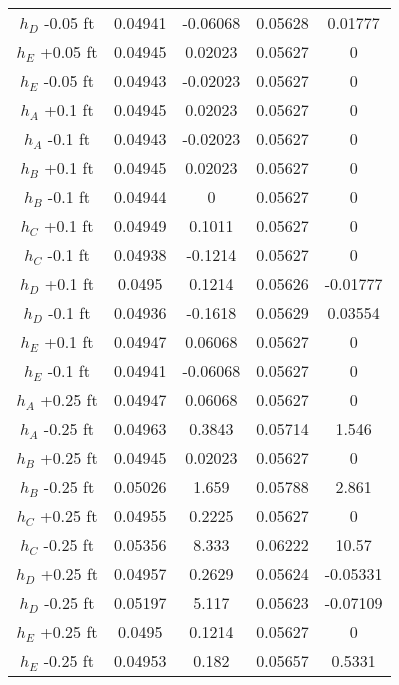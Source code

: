 \begin{linenumbers}
\begin{spacing}{1.0}
\begin{center}
\begin{longtable}{c|cc|cc}
	$h_{D}$ -0.05 ft&						0.04941&	-0.06068&	0.05628&	0.01777\\ 
	$h_{E}$ +0.05 ft&						0.04945&	0.02023&	0.05627&	0\\       
	$h_{E}$ -0.05 ft&						0.04943&	-0.02023&	0.05627&	0\\       
	$h_{A}$ +0.1 ft	&						0.04945&	0.02023&	0.05627&	0\\       
	$h_{A}$ -0.1 ft	&						0.04943&	-0.02023&	0.05627&	0\\       
	$h_{B}$ +0.1 ft	&						0.04945&	0.02023&	0.05627&	0\\       
	$h_{B}$ -0.1 ft	&						0.04944&	0&	0.05627&	0\\               
	$h_{C}$ +0.1 ft	&						0.04949&	0.1011&	0.05627&	0\\           
	$h_{C}$ -0.1 ft	&						0.04938&	-0.1214&	0.05627&	0\\       
	$h_{D}$ +0.1 ft	&						0.0495&	0.1214&	0.05626&	-0.01777\\        
	$h_{D}$ -0.1 ft	&						0.04936&	-0.1618&	0.05629&	0.03554\\ 
	$h_{E}$ +0.1 ft	&						0.04947&	0.06068&	0.05627&	0\\       
	$h_{E}$ -0.1 ft	&						0.04941&	-0.06068&	0.05627&	0\\       
	$h_{A}$ +0.25 ft&						0.04947&	0.06068&	0.05627&	0\\       
	$h_{A}$ -0.25 ft&						0.04963&	0.3843&	0.05714&	1.546\\       
	$h_{B}$ +0.25 ft&						0.04945&	0.02023&	0.05627&	0\\       
	$h_{B}$ -0.25 ft&						0.05026&	1.659&	0.05788&	2.861\\       
	$h_{C}$ +0.25 ft&						0.04955&	0.2225&	0.05627&	0\\           
	$h_{C}$ -0.25 ft&						0.05356&	8.333&	0.06222&	10.57\\       
	$h_{D}$ +0.25 ft&						0.04957&	0.2629&	0.05624&	-0.05331\\    
	$h_{D}$ -0.25 ft&						0.05197&	5.117&	0.05623&	-0.07109\\    
	$h_{E}$ +0.25 ft&						0.0495&	0.1214&	0.05627&	0\\               
	$h_{E}$ -0.25 ft&						0.04953&	0.182&	0.05657&	0.5331\\      
    \hline
\end{longtable}%
\end{center}
\end{spacing}


\end{linenumbers}
